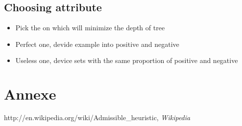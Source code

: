 \subsection{Choosing attribute}
\begin{itemize}
\item Pick the on which will minimize the depth of tree
\item Perfect one, devide example into positive and negative
\item Useless one, device sets with the same proportion of positive and negative
\end{itemize}

\section{Annexe}
%

\begin{thebibliography}{1}
 http://en.wikipedia.org/wiki/Admissible\_heuristic, {\em Wikipedia}
\end{thebibliography}


